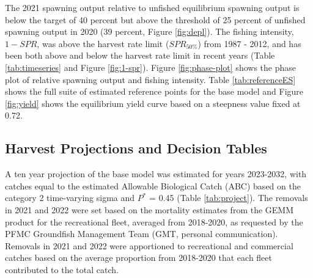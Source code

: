 \documentclass[11pt,
  english,
  a4paper,
]{article}
\begin{document}
\leavevmode\tagmcend\tagstructend\par


The 2021 spawning output relative to unfished equilibrium spawning output is below the target of 40 percent but above the threshold of 25 percent of unfished spawning output in 2020 (39 percent, Figure \ref{fig:depl}). The fishing intensity, {\(1-SPR\)\leavevmode\tagmcend\tagstructend}, was above the harvest rate limit ({\(SPR_{50\%}\)\leavevmode\tagmcend\tagstructend}) from 1987 - 2012, and has been both above and below the harvest rate limit in recent years (Table \ref{tab:timeseries} and Figure \ref{fig:1-spr}). Figure \ref{fig:phase-plot} shows the phase plot of relative spawning output and fishing intensity. Table \ref{tab:referenceES} shows the full suite of estimated reference points for the base model and Figure \ref{fig:yield} shows the equilibrium yield curve based on a steepness value fixed at 0.72.

\leavevmode\tagmcend\tagstructend\par


\hypertarget{harvest-projections-and-decision-tables}{%
\subsection{Harvest Projections and Decision Tables}\label{harvest-projections-and-decision-tables}}

\leavevmode\tagmcend\tagstructend


A ten year projection of the base model was estimated for years 2023-2032, with catches equal to the estimated Allowable Biological Catch (ABC) based on the category 2 time-varying sigma and {\(P^*\)\leavevmode\tagmcend\tagstructend} = 0.45 (Table \ref{tab:project}). The removals in 2021 and 2022 were set based on the mortality estimates from the GEMM product for the recreational fleet, averaged from 2018-2020, as requested by the PFMC Groundfish Management Team (GMT, personal communication). Removals in 2021 and 2022 were apportioned to recreational and commercial catches based on the average proportion from 2018-2020 that each fleet contributed to the total catch.
\end{document}
